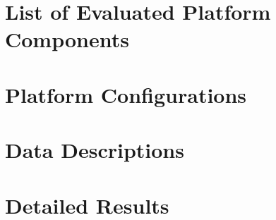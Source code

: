 \chapter{List of Evaluated Platform Components}
\label{chapter:first-appendix}





\chapter{Platform Configurations}
\label{chapter:appendixb}

\chapter{Data Descriptions}
\label{chapter:appendixc}

\chapter{Detailed Results}
\label{chapter:appendixd}



